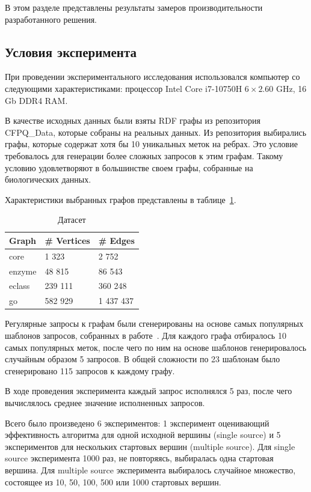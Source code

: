 
В этом разделе представлены результаты замеров производительности разработанного решения.

\subsection{Условия эксперимента}

При проведении экспериментального исследования использовался компьютер со следующими характеристиками: процессор Intel Core i7-10750H $6\times2.60$ GHz, 16 Gb DDR4 RAM. 

В качестве исходных данных были взяты RDF графы из репозитория CFPQ\_Data, которые собраны на реальных данных. Из репозитория выбирались графы, которые содержат хотя бы 10 уникальных меток на ребрах. Это условие требовалось для генерации более сложных запросов к этим графам. Такому условию удовлетворяют в большинстве своем графы, собранные на  биологических данных.

Характеристики выбранных графов представлены в таблице~\ref{table:dataset}.

\begin{table}[!ht]\caption{Датасет}\label{table:dataset}
    \centering
    \begin{tabular}{|l|l|l|}
    \hline
\rowcolor{lightgray}        Graph & \# Vertices & \# Edges \\ \hline
        core & 1 323 & 2 752 \\ \hline
        enzyme & 48 815 & 86 543 \\ \hline
        eclass & 239 111 & 360 248 \\ \hline
        go & 582 929 & 1 437 437 \\ \hline
    \end{tabular}
\end{table}

Регулярные запросы к графам были сгенерированы на основе самых популярных шаблонов запросов, собранных в  работе~\cite{experiment_shemetova2021}. Для каждого графа отбиралось 10 самых популярных меток, после чего по ним на основе шаблонов генерировалось случайным образом 5 запросов. В общей сложности по 23 шаблонам было сгенерировано 115 запросов к каждому графу.

В ходе проведения эксперимента каждый запрос исполнялся 5 раз, после чего вычислялось среднее значение исполненных запросов.

Всего было произведено 6 экспериментов: 1 эксперимент оценивающий эффективность алгоритма для одной исходной вершины (single source) и 5 экспериментов для нескольких стартовых вершин (multiple source).
Для single source эксперимента 1000 раз, не повторяясь, выбиралась одна стартовая вершина. Для multiple source эксперимента выбиралось случайное множество, состоящее из 10, 50, 100, 500 или 1000 стартовых вершин.

